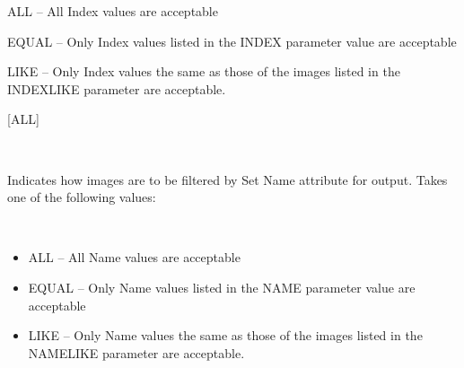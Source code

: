 \documentclass[twoside,11pt]{article}
\renewcommand{\_}{\texttt{\symbol{95}}}
\newcommand{\sstsubsection}[1]{ \item[{#1}] \mbox{} \\}
\newcommand{\sstitemlist}[1]{
  \mbox{} \\
  \vspace{-3.5ex}
  \begin{itemize}
     #1
  \end{itemize}
}
\newcommand{\sstitem}{\item}
\newcommand{\sstsubsection}[1]{\item[{#1}]}
\newcommand{\sstitemlist}[1]{
      \begin{itemize}
         #1
      \end{itemize}
      \\
   }
\newcommand{\sstitem}{\item}
\begin{document}
{{{{            \sstitem
               ALL     -- All Index values are acceptable

            \sstitem
               EQUAL   -- Only Index values listed in the INDEX parameter
                            value are acceptable

            \sstitem
               LIKE    -- Only Index values the same as those of the images
                            listed in the INDEXLIKE parameter are acceptable.

         }
         [ALL]
      }
      \sstsubsection{
         PICKNAME = LITERAL (Read)
      }{
         Indicates how images are to be filtered by Set Name attribute for
         output.  Takes one of the following values:
         \sstitemlist{

            \sstitem
               ALL     -- All Name values are acceptable

            \sstitem
               EQUAL   -- Only Name values listed in the NAME parameter
                            value are acceptable

            \sstitem
               LIKE    -- Only Name values the same as those of the images
                            listed in the NAMELIKE parameter are acceptable.

}}}}
\end{document}
